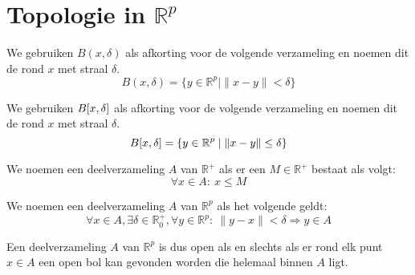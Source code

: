 \documentclass[main.tex]{subfiles}
\begin{document}
\section{Topologie in $\mathbb{R}^p$}
\label{sec:topologie-mathbbrp}

\begin{de}
  We gebruiken $B(x,\delta)$ als afkorting voor de volgende verzameling en noemen dit de  rond $x$ met straal $\delta$.
  \[ B(x,\delta) = \{ y \in \mathbb{R}^{p} \mid \|x-y\| < \delta \} \]
\end{de}

\begin{de}
  We gebruiken $B\interval{x}{\delta}$ als afkorting voor de volgende verzameling en noemen dit de  rond $x$ met straal $\delta$.
  \[ B\interval{x}{\delta} = \{ y \in \mathbb{R}^{p} \mid \|x-y\| \le \delta \} \]
\end{de}

\begin{de}
  We noemen een deelverzameling $A$ van $\mathbb{R}^{+}$  als er een $M \in \mathbb{R}^{+}$ bestaat als volgt:
  \[ \forall x \in A:\ x \le M \]
\end{de}

\begin{de}
  We noemen een deelverzameling $A$ van $\mathbb{R}^{p}$  als het volgende geldt:
  \[ \forall x\in A, \exists \delta \in \mathbb{R}_{0}^{+}, \forall y\in \mathbb{R}^{p}:\ \|y-x\| < \delta \Rightarrow y \in A \]
\end{de}

\begin{opm}
  Een deelverzameling $A$ van $\mathbb{R}^{p}$ is dus open als en slechts als er rond elk punt $x\in A$ een open bol kan gevonden worden die helemaal binnen $A$ ligt.
\end{opm}
\end{document}
